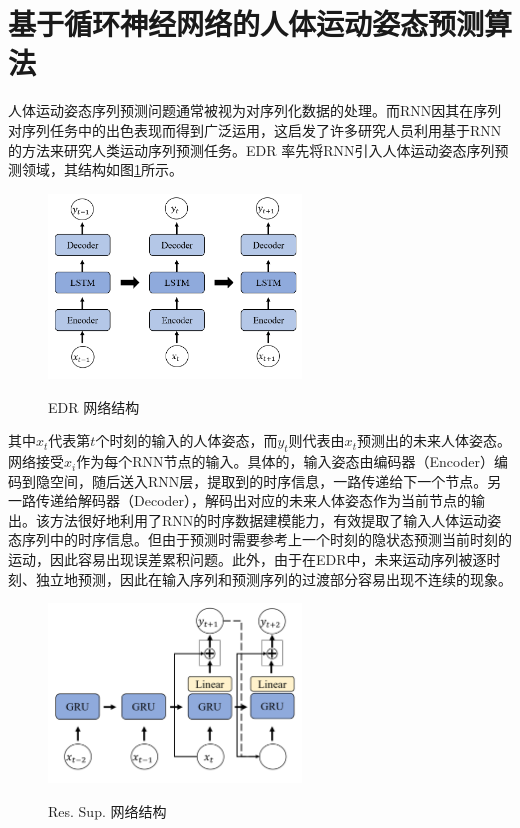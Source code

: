 \section{基于循环神经网络的人体运动姿态预测算法}
人体运动姿态序列预测问题通常被视为对序列化数据的处理。而RNN因其在序列对序列任务中的出色表现而得到广泛运用，这启发了许多研究人员利用基于RNN的方法来研究人类运动序列预测任务。EDR \parencite{fragkiadaki2015recurrent} 率先将RNN引入人体运动姿态序列预测领域，其结构如图\ref{fig:EDR}所示。
\begin{figure}[ht]
    \centering
    \includegraphics[width=0.6\textwidth]{FigMa/EDR.png}\\
    \vspace{-0.3cm}
    \caption{EDR 网络结构}
    \label{fig:EDR}
\end{figure}
其中$x_t$代表第$t$个时刻的输入的人体姿态，而$y_t$则代表由$x_t$预测出的未来人体姿态。网络接受$x_i$作为每个RNN节点的输入。具体的，输入姿态由编码器（Encoder）编码到隐空间，随后送入RNN层，提取到的时序信息，一路传递给下一个节点。另一路传递给解码器（Decoder），解码出对应的未来人体姿态作为当前节点的输出。该方法很好地利用了RNN的时序数据建模能力，有效提取了输入人体运动姿态序列中的时序信息。但由于预测时需要参考上一个时刻的隐状态预测当前时刻的运动，因此容易出现误差累积问题。此外，由于在EDR中，未来运动序列被逐时刻、独立地预测，因此在输入序列和预测序列的过渡部分容易出现不连续的现象。
\begin{figure}[ht]
    \centering
    \includegraphics[width=0.6\textwidth]{FigMa/ResSup.png}\\
    \vspace{-0.3cm}
    \caption{Res. Sup. 网络结构}
    \label{fig:ResSup}
\end{figure}
